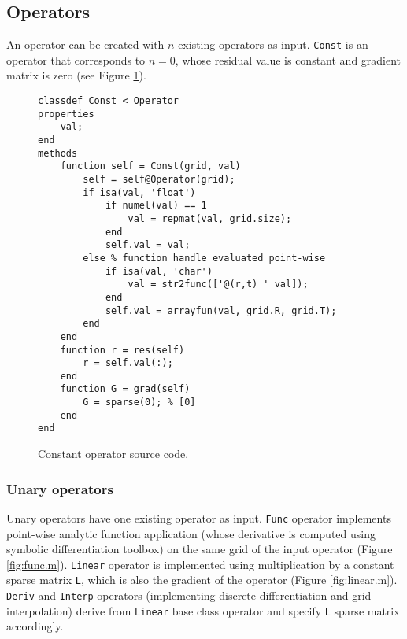 \documentclass[MSc,beforeExam]{iitcsthesis}
\begin{document}
\subsection{Operators}
An operator can be created with $n$ existing operators as input.
\verb|Const| is an operator that corresponds to $n=0$, whose 
residual value is constant and gradient matrix is zero (see Figure \ref{fig:const.m}).

\begin{figure}[h]
\begin{verbatim}
classdef Const < Operator
properties
    val;
end
methods
    function self = Const(grid, val)
        self = self@Operator(grid);
        if isa(val, 'float')
            if numel(val) == 1
                val = repmat(val, grid.size);
            end
            self.val = val;
        else % function handle evaluated point-wise
            if isa(val, 'char')
                val = str2func(['@(r,t) ' val]);
            end
            self.val = arrayfun(val, grid.R, grid.T);
        end
    end
    function r = res(self)
        r = self.val(:);
    end
    function G = grad(self)
        G = sparse(0); % [0]
    end
end
\end{verbatim}
\caption{Constant operator source code.} \label{fig:const.m}
\end{figure}

\subsubsection{Unary operators}
Unary operators have one existing operator as input. 
\verb|Func| operator implements point-wise analytic function
application (whose derivative is computed using symbolic differentiation toolbox) on the same grid of the input operator (Figure \ref{fig:func.m}). 
\verb|Linear| operator is implemented
using multiplication by a constant sparse matrix 
\verb|L|, which is also the gradient of the operator
(Figure \ref{fig:linear.m}).
\verb|Deriv| and \verb|Interp| operators (implementing discrete
differentiation and grid interpolation) derive from \verb|Linear|
base class operator and specify \verb|L| sparse matrix accordingly.
\end{document}
